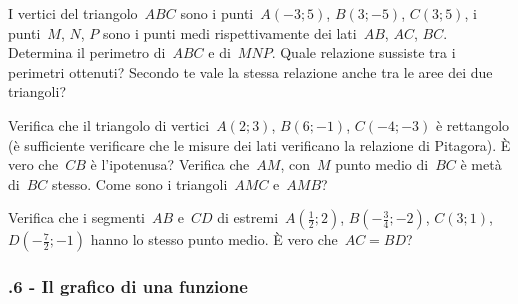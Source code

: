 \begin{esercizio}
\label{ese:\thechapter.36}
I vertici del triangolo~$ABC$ sono i punti~$A(-3;5)$, $B(3;-5)$, $C(3;5)$, i punti~$M$, $N$, $P$ sono i punti medi
rispettivamente dei lati~$AB$, $AC$, $BC$. Determina il perimetro di~$ABC$ e di~$MNP$.
Quale relazione sussiste tra i perimetri ottenuti? Secondo te vale la stessa relazione anche tra le aree dei due triangoli?
\end{esercizio}

\begin{esercizio}
\label{ese:\thechapter.37}
Verifica che il triangolo di vertici~$A(2;3)$, $B(6;-1)$, $C(-4;-3)$ è rettangolo (è sufficiente verificare
che le misure dei lati verificano la relazione di Pitagora). È vero che~$CB$ è l'ipotenusa?
Verifica che~$AM$, con~$M$ punto medio di~$BC$ è metà di~$BC$ stesso. Come sono i triangoli~${AMC}$ e~${AMB}$?
\end{esercizio}

\begin{esercizio}
\label{ese:\thechapter.38}
Verifica che i segmenti~${AB}$ e~${CD}$ di estremi~$A\left(\frac{1}{2};2\right)$, $B\left(-{\frac{3}{4}};-2\right)$, $C(3;1)$,
$D\left(-{\frac{7}{2}};-1\right)$ hanno lo stesso punto medio. È vero che~${AC}={BD}$?
\end{esercizio}

\subsubsection*{\thechapter.6 - Il grafico di una funzione}

